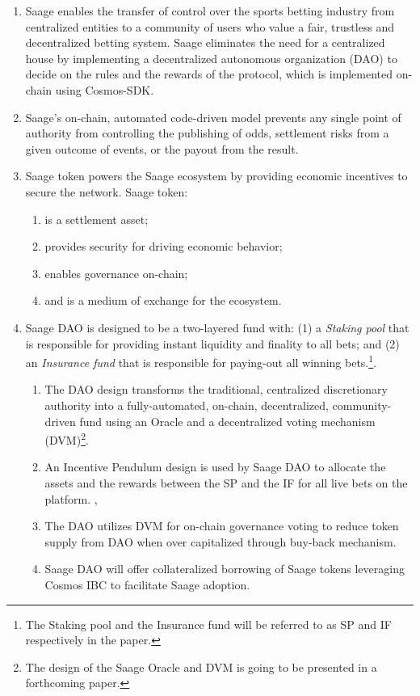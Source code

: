 \documentclass[%
 aapm,
 mph,%
 amsmath,amssymb,
 reprint,%
]{revtex4-2}
\begin{document}
\begin{enumerate}
\item Saage enables the transfer of control over the sports betting industry from centralized entities to a community of users who value a fair, trustless and decentralized betting system. Saage eliminates the need for a centralized house by implementing a decentralized autonomous organization (DAO) to decide on the rules and the rewards of the protocol, which is implemented on-chain using Cosmos-SDK. 
\item Saage’s on-chain, automated code-driven model prevents any single point of authority from controlling the publishing of odds, settlement risks from a given outcome of events, or the payout from the result. 
\item Saage token powers the Saage ecosystem by providing economic incentives to secure the network. Saage token:
\begin{enumerate}
\item is a settlement asset; \item provides security for driving economic behavior; \item enables governance on-chain; \item and is a medium of exchange for the ecosystem. 
\end{enumerate}
\item Saage DAO is designed to be a two-layered fund with: (1) a \textit{Staking pool} that is responsible for providing instant liquidity and finality to all bets; and (2) an \textit{Insurance fund} that is responsible for paying-out all winning bets.\footnote{The Staking pool and the Insurance fund will be referred to as SP and IF respectively in the paper.}. 
\begin{enumerate}
\item The DAO design transforms the traditional, centralized discretionary authority into a fully-automated, on-chain, decentralized, community-driven fund using an Oracle and a decentralized voting mechanism (DVM)\footnote{The design of the Saage Oracle and DVM is going to be presented in a forthcoming paper.}. 
\item An Incentive Pendulum design is used by Saage DAO to allocate the assets and the rewards between the SP and the IF for all live bets on the platform. , 
\item The DAO utilizes DVM for on-chain governance voting to reduce token supply from DAO when over capitalized through buy-back mechanism.
\item Saage DAO will offer collateralized borrowing of Saage tokens leveraging Cosmos IBC to facilitate Saage adoption.
\end{enumerate}
\end{enumerate}
\end{document}
